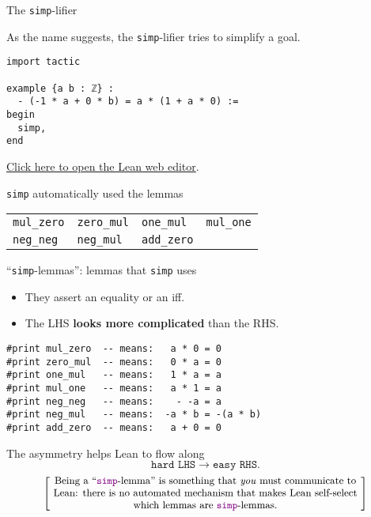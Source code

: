 \documentclass{beamer}
\begin{document}
\begin{frame}[fragile]{The {\color{violet}\texttt{simp}}-lifier}

As the name suggests, the {\color{violet}\verb`simp`}-lifier tries to simplify a goal.

\begin{verbatim}
import tactic

example {a b : ℤ} :
  - (-1 * a + 0 * b) = a * (1 + a * 0) :=
begin
  simp,
end
\end{verbatim}

\vspace{-17pt}
{\small{\href{https://leanprover-community.github.io/lean-web-editor/#code=import%20tactic%0A%0Aexample%20%7Ba%20b%20%3A%20%E2%84%A4%7D%20%3A%0A%20%20-%20%28-1%20*%20a%20%2B%200%20*%20b%29%20%3D%20a%20*%20%281%20%2B%20a%20*%200%29%20%3A%3D%0Abegin%0A%20%20simp%2C%0Aend}{Click here to open the Lean web editor}.}}

{\color{violet}\verb`simp`} automatically used the lemmas

\begin{tabular}{|l|l|l|l|}
\hline
 {\color{violet}\verb`mul_zero`} & {\color{violet}\verb`zero_mul`} & {\color{violet}\verb`one_mul`} & {\color{violet}\verb`mul_one`} \\
{\color{violet}\verb`neg_neg`} & {\color{violet}\verb`neg_mul`} & {\color{violet}\verb`add_zero`} &\\
\hline
\end{tabular}

\end{frame}

\begin{frame}[fragile]{``{\color{violet}\texttt{simp}}-lemmas'': lemmas that {\color{violet}\texttt{simp}} uses}
\vphantom{}
\vspace{-13pt}
\begin{itemize}
\setlength\itemsep{-12pt}
\item
  They assert an equality or an iff.
\item
  The LHS {\textbf{looks more complicated}} than the RHS.
\end{itemize}
\vspace{-20pt}
\begin{verbatim}
#print mul_zero  -- means:   a * 0 = 0
#print zero_mul  -- means:   0 * a = 0
#print one_mul   -- means:   1 * a = a
#print mul_one   -- means:   a * 1 = a
#print neg_neg   -- means:    - -a = a
#print neg_mul   -- means:  -a * b = -(a * b)
#print add_zero  -- means:   a + 0 = 0
\end{verbatim}
\vspace{-10pt}
The asymmetry helps Lean to flow along
$$
  {\texttt{hard LHS}} \longrightarrow {\texttt{easy RHS}}.
$$
\[
  \left[ \;
  \parbox{0.8\textwidth}{\centering\small
  Being a ``{\color{violet}\texttt{simp}}-lemma'' is something that {\emph{you}} must communicate to Lean: there is no automated mechanism that makes Lean self-select which lemmas are {\color{violet}\texttt{simp}}-lemmas.
  }
  \; \right]
\]
\end{frame}
\end{document}
